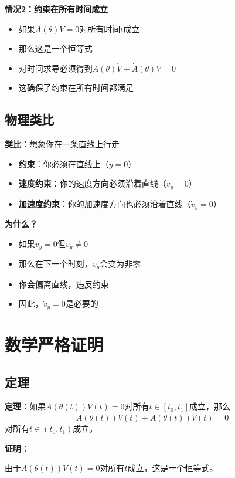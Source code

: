 \documentclass[12pt,a4paper]{article}
\begin{document}
\textbf{情况2：约束在所有时间成立}
\begin{itemize}
\item 如果$A(\theta)V = 0$对所有时间$t$成立
\item 那么这是一个恒等式
\item 对时间求导必须得到$A(\theta)\dot{V} + \dot{A}(\theta)V = 0$
\item 这确保了约束在所有时间都满足
\end{itemize}

\subsection{物理类比}

\textbf{类比}：想象你在一条直线上行走

\begin{itemize}
\item \textbf{约束}：你必须在直线上（$y = 0$）
\item \textbf{速度约束}：你的速度方向必须沿着直线（$v_y = 0$）
\item \textbf{加速度约束}：你的加速度方向也必须沿着直线（$\dot{v}_y = 0$）
\end{itemize}

\textbf{为什么？}
\begin{itemize}
\item 如果$v_y = 0$但$\dot{v}_y \neq 0$
\item 那么在下一个时刻，$v_y$会变为非零
\item 你会偏离直线，违反约束
\item 因此，$\dot{v}_y = 0$是必要的
\end{itemize}

\section{数学严格证明}

\subsection{定理}

\textbf{定理}：如果$A(\theta(t))V(t) = 0$对所有$t \in [t_0, t_1]$成立，那么
\begin{equation}
A(\theta(t))\dot{V}(t) + \dot{A}(\theta(t))V(t) = 0
\end{equation}
对所有$t \in (t_0, t_1)$成立。

\textbf{证明}：

由于$A(\theta(t))V(t) = 0$对所有$t$成立，这是一个恒等式。
\end{document}
